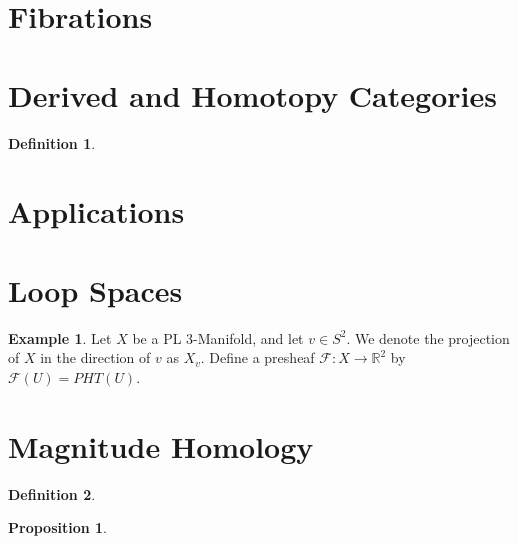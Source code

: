 \documentclass[12pt]{article}
\theoremstyle{theorem}
\newtheorem{proposition}[theorem]{Proposition}
\theoremstyle{definition}
\newtheorem{definition}{Definition} [section]
\newtheorem{example}{Example}
\theoremstyle{remark}
\theoremstyle{gremark}
\theoremstyle{discussion}
\theoremstyle{notation}
\begin{document}
	\section{Fibrations}
	
	

	\section{Derived and Homotopy Categories}

	\begin{definition}
		
	\end{definition}
	
	
	\section{Applications}
	
	\section{Loop Spaces}
	
	
	
	
	\begin{example}
		Let $X$ be a PL $3$-Manifold, and let $v\in S^2$. We denote the projection of $X$ in the direction of $v$ as $X_v$.  Define a presheaf $\mathcal{F}:X\to \mathbb{R}^2$ by $\mathcal{F}(U)=PHT(U)$.
	\end{example}
	
	
	
	
	\section*{Magnitude Homology}
	
	\begin{definition}
		
	\end{definition}
	
	\begin{proposition}
		
	\end{proposition}
	
	
	
	
	
	
	
	
\end{document}
